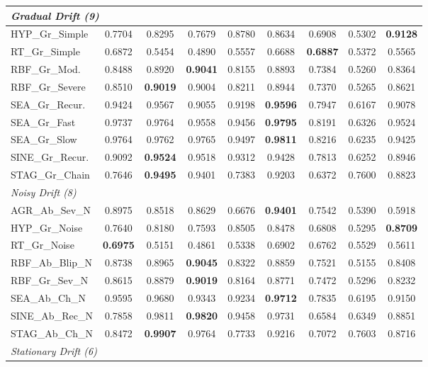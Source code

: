 \documentclass[lettersize,10pt]{article}
\begin{document}
\begin{longtable}{lcccccccc}
\midrule \multicolumn{9}{l}{\textit{Gradual Drift (9)}}\\
\midrule
HYP\_Gr\_Simple & 0.7704 & 0.8295 & 0.7679 & 0.8780 & 0.8634 & 0.6908 & 0.5302 & \textbf{0.9128} \\
RT\_Gr\_Simple & 0.6872 & 0.5454 & 0.4890 & 0.5557 & 0.6688 & \textbf{0.6887} & 0.5372 & 0.5565 \\
RBF\_Gr\_Mod. & 0.8488 & 0.8920 & \textbf{0.9041} & 0.8155 & 0.8893 & 0.7384 & 0.5260 & 0.8364 \\
RBF\_Gr\_Severe & 0.8510 & \textbf{0.9019} & 0.9004 & 0.8211 & 0.8944 & 0.7370 & 0.5265 & 0.8621 \\
SEA\_Gr\_Recur. & 0.9424 & 0.9567 & 0.9055 & 0.9198 & \textbf{0.9596} & 0.7947 & 0.6167 & 0.9078 \\
SEA\_Gr\_Fast & 0.9737 & 0.9764 & 0.9558 & 0.9456 & \textbf{0.9795} & 0.8191 & 0.6326 & 0.9524 \\
SEA\_Gr\_Slow & 0.9764 & 0.9762 & 0.9765 & 0.9497 & \textbf{0.9811} & 0.8216 & 0.6235 & 0.9425 \\
SINE\_Gr\_Recur. & 0.9092 & \textbf{0.9524} & 0.9518 & 0.9312 & 0.9428 & 0.7813 & 0.6252 & 0.8946 \\
STAG\_Gr\_Chain & 0.7646 & \textbf{0.9495} & 0.9401 & 0.7383 & 0.9203 & 0.6372 & 0.7600 & 0.8823 \\
\midrule \multicolumn{9}{l}{\textit{Noisy Drift (8)}}\\
\midrule
AGR\_Ab\_Sev\_N & 0.8975 & 0.8518 & 0.8629 & 0.6676 & \textbf{0.9401} & 0.7542 & 0.5390 & 0.5918 \\
HYP\_Gr\_Noise & 0.7640 & 0.8180 & 0.7593 & 0.8505 & 0.8478 & 0.6808 & 0.5295 & \textbf{0.8709} \\
RT\_Gr\_Noise & \textbf{0.6975} & 0.5151 & 0.4861 & 0.5338 & 0.6902 & 0.6762 & 0.5529 & 0.5611 \\
RBF\_Ab\_Blip\_N & 0.8738 & 0.8965 & \textbf{0.9045} & 0.8322 & 0.8859 & 0.7521 & 0.5155 & 0.8408 \\
RBF\_Gr\_Sev\_N & 0.8615 & 0.8879 & \textbf{0.9019} & 0.8164 & 0.8771 & 0.7472 & 0.5296 & 0.8232 \\
SEA\_Ab\_Ch\_N & 0.9595 & 0.9680 & 0.9343 & 0.9234 & \textbf{0.9712} & 0.7835 & 0.6195 & 0.9150 \\
SINE\_Ab\_Rec\_N & 0.7858 & 0.9811 & \textbf{0.9820} & 0.9458 & 0.9731 & 0.6584 & 0.6349 & 0.8851 \\
STAG\_Ab\_Ch\_N & 0.8472 & \textbf{0.9907} & 0.9764 & 0.7733 & 0.9216 & 0.7072 & 0.7603 & 0.8716 \\
\midrule \multicolumn{9}{l}{\textit{Stationary Drift (6)}}\\

\end{longtable}
\end{document}
